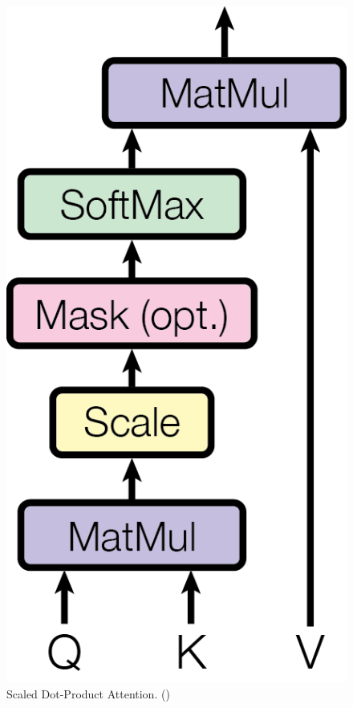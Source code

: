 \begin{figure}
\begin{minipage}[b]{0.5\textwidth}
    \includegraphics[scale=0.7]{images/ModalNet-19}
    \caption{Scaled Dot-Product Attention. ()}
    \label{fig:dot-att}
  \end{minipage}
\end{figure}

